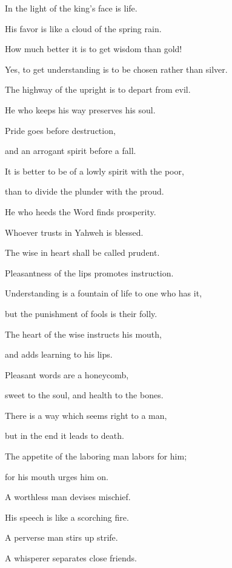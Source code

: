 {\par }{\Q {}In the light of the king’s face is life.
\par }{\QB His favor is like a cloud of the spring rain.
\par }{\Q {}How much better it is to get wisdom than gold!
\par }{\QB Yes, to get understanding is to be chosen rather than silver.
\par }{\Q {}The highway of the upright is to depart from evil.
\par }{\QB He who keeps his way preserves his soul.
\par }{\Q {}Pride goes before destruction,
\par }{\QB and an arrogant spirit before a fall.
\par }{\Q {}It is better to be of a lowly spirit with the poor,
\par }{\QB than to divide the plunder with the proud.
\par }{\Q {}He who heeds the Word finds prosperity.
\par }{\QB Whoever trusts in Yahweh is blessed.
\par }{\Q {}The wise in heart shall be called prudent.
\par }{\QB Pleasantness of the lips promotes instruction.
\par }{\Q {}Understanding is a fountain of life to one who has it,
\par }{\QB but the punishment of fools is their folly.
\par }{\Q {}The heart of the wise instructs his mouth,
\par }{\QB and adds learning to his lips.
\par }{\Q {}Pleasant words are a honeycomb,
\par }{\QB sweet to the soul, and health to the bones.
\par }{\Q {}There is a way which seems right to a man,
\par }{\QB but in the end it leads to death.
\par }{\Q {}The appetite of the laboring man labors for him;
\par }{\QB for his mouth urges him on.
\par }{\Q {}A worthless man devises mischief.
\par }{\QB His speech is like a scorching fire.
\par }{\Q {}A perverse man stirs up strife.
\par }{\QB A whisperer separates close friends.
}
